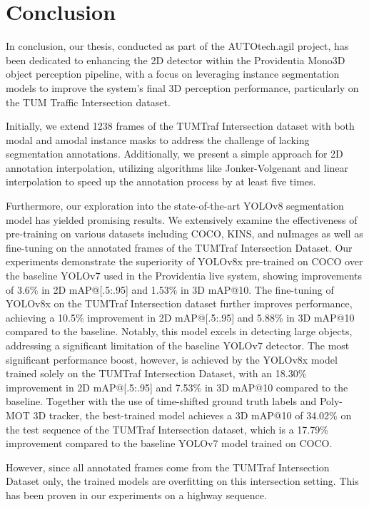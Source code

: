 \chapter{Conclusion}  \label{chap:seven}%

In conclusion, our thesis, conducted as part of the AUTOtech.agil project, has been dedicated to enhancing the 2D detector within the Providentia Mono3D object perception pipeline, with a focus on leveraging instance segmentation models to improve the system's final 3D perception performance, particularly on the TUM Traffic Intersection dataset.

Initially, we extend 1238 frames of the TUMTraf Intersection dataset with both modal and amodal instance masks to address the challenge of lacking segmentation annotations. Additionally, we present a simple approach for 2D annotation interpolation, utilizing algorithms like Jonker-Volgenant and linear interpolation to speed up the annotation process by at least five times.

Furthermore, our exploration into the state-of-the-art YOLOv8 segmentation model has yielded promising results. We extensively examine the effectiveness of pre-training on various datasets including COCO, KINS, and nuImages as well as fine-tuning on the annotated frames of the TUMTraf Intersection Dataset. Our experiments demonstrate the superiority of YOLOv8x pre-trained on COCO over the baseline YOLOv7 used in the Providentia live system, showing improvements of 3.6\% in 2D mAP@[.5:.95] and 1.53\% in 3D mAP@10. The fine-tuning of YOLOv8x on the TUMTraf Intersection dataset further improves performance, achieving a 10.5\% improvement in 2D mAP@[.5:.95] and 5.88\% in 3D mAP@10 compared to the baseline. Notably, this model excels in detecting large objects, addressing a significant limitation of the baseline YOLOv7 detector. The most significant performance boost, however, is achieved by the YOLOv8x model trained solely on the TUMTraf Intersection Dataset, with an 18.30\% improvement in 2D mAP@[.5:.95] and 7.53\% in 3D mAP@10 compared to the baseline. Together with the use of time-shifted ground truth labels and Poly-MOT 3D tracker, the best-trained model achieves a 3D mAP@10 of 34.02\% on the test sequence of the TUMTraf Intersection dataset, which is a 17.79\% improvement compared to the baseline YOLOv7 model trained on COCO. 

However, since all annotated frames come from the TUMTraf Intersection Dataset only, the trained models are overfitting on this intersection setting. This has been proven in our experiments on a highway sequence. 

